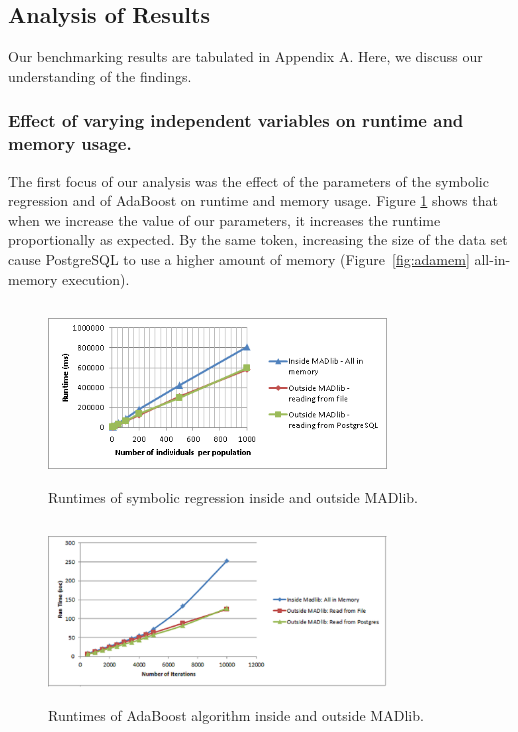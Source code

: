 
\subsection{Analysis of Results}
Our benchmarking results are tabulated in Appendix A. Here, we discuss our understanding of the findings.

\subsubsection*{Effect of varying independent variables on runtime and memory usage.}
The first focus of our analysis was the effect of the parameters of the symbolic regression and of AdaBoost on runtime and memory usage. Figure \ref{fig:gp-inside-vs-outside} shows that when we increase the value of our parameters, it increases the runtime proportionally as expected. By the same token,  increasing the size of the data set cause PostgreSQL to use a higher amount of memory (Figure~\ref{fig:adamem} all-in-memory execution).

\begin{figure}[ht]
\centering
\includegraphics[width=0.8\textwidth,height=180px]{gp-inside-vs-outside.png}
\caption{Runtimes of symbolic regression inside and outside MADlib.}
\label{fig:gp-inside-vs-outside}
\end{figure}

\begin{figure}[ht]
\centering
\includegraphics[width=0.8\textwidth,height=180px]{ada1.png}
\caption{Runtimes of AdaBoost algorithm inside and outside MADlib.}
\label{fig:adainout}
\end{figure}

